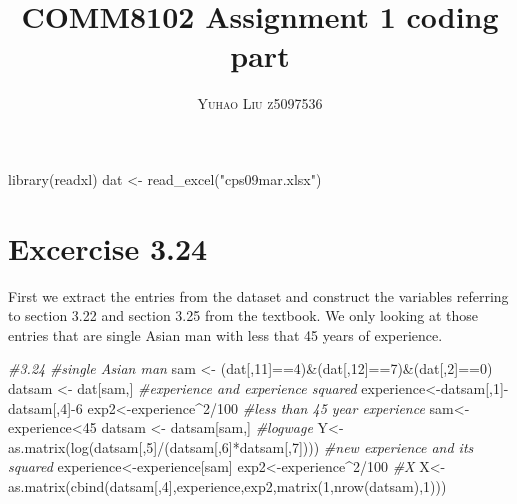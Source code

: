 \documentclass[
]{article}
\title{COMM8102 Assignment 1 coding part}
\author{\textsc{Yuhao Liu z5097536}}
\date{\vspace{-2.5em}}
\newenvironment{Shaded}{\begin{snugshade}}{\end{snugshade}}
\newcommand{\CommentTok}[1]{\textcolor[rgb]{0.56,0.35,0.01}{\textit{#1}}}
\newcommand{\DecValTok}[1]{\textcolor[rgb]{0.00,0.00,0.81}{#1}}
\newcommand{\FunctionTok}[1]{\textcolor[rgb]{0.00,0.00,0.00}{#1}}
\newcommand{\NormalTok}[1]{#1}
\newcommand{\OtherTok}[1]{\textcolor[rgb]{0.56,0.35,0.01}{#1}}
\newcommand{\SpecialCharTok}[1]{\textcolor[rgb]{0.00,0.00,0.00}{#1}}
\newcommand{\StringTok}[1]{\textcolor[rgb]{0.31,0.60,0.02}{#1}}
\begin{document}
\maketitle

\begin{Shaded}
\begin{Highlighting}[]
\FunctionTok{library}\NormalTok{(readxl)}
\NormalTok{dat }\OtherTok{\textless{}{-}} \FunctionTok{read\_excel}\NormalTok{(}\StringTok{"cps09mar.xlsx"}\NormalTok{)}
\end{Highlighting}
\end{Shaded}

\hypertarget{excercise-3.24}{%
\section{Excercise 3.24}\label{excercise-3.24}}

First we extract the entries from the dataset and construct the
variables referring to section 3.22 and section 3.25 from the textbook.
We only looking at those entries that are single Asian man with less
that 45 years of experience.

\begin{Shaded}
\begin{Highlighting}[]
\CommentTok{\#3.24 }
\CommentTok{\#single Asian man }
\NormalTok{sam }\OtherTok{\textless{}{-}}\NormalTok{ (dat[,}\DecValTok{11}\NormalTok{]}\SpecialCharTok{==}\DecValTok{4}\NormalTok{)}\SpecialCharTok{\&}\NormalTok{(dat[,}\DecValTok{12}\NormalTok{]}\SpecialCharTok{==}\DecValTok{7}\NormalTok{)}\SpecialCharTok{\&}\NormalTok{(dat[,}\DecValTok{2}\NormalTok{]}\SpecialCharTok{==}\DecValTok{0}\NormalTok{)}
\NormalTok{datsam }\OtherTok{\textless{}{-}}\NormalTok{ dat[sam,]}
\CommentTok{\#experience and experience squared}
\NormalTok{experience}\OtherTok{\textless{}{-}}\NormalTok{datsam[,}\DecValTok{1}\NormalTok{]}\SpecialCharTok{{-}}\NormalTok{datsam[,}\DecValTok{4}\NormalTok{]}\SpecialCharTok{{-}}\DecValTok{6}
\NormalTok{exp2}\OtherTok{\textless{}{-}}\NormalTok{experience}\SpecialCharTok{\^{}}\DecValTok{2}\SpecialCharTok{/}\DecValTok{100}
\CommentTok{\#less than 45 year experience}
\NormalTok{sam}\OtherTok{\textless{}{-}}\NormalTok{experience}\SpecialCharTok{\textless{}}\DecValTok{45}
\NormalTok{datsam }\OtherTok{\textless{}{-}}\NormalTok{ datsam[sam,]}
\CommentTok{\#logwage}
\NormalTok{Y}\OtherTok{\textless{}{-}}\FunctionTok{as.matrix}\NormalTok{(}\FunctionTok{log}\NormalTok{(datsam[,}\DecValTok{5}\NormalTok{]}\SpecialCharTok{/}\NormalTok{(datsam[,}\DecValTok{6}\NormalTok{]}\SpecialCharTok{*}\NormalTok{datsam[,}\DecValTok{7}\NormalTok{])))}
\CommentTok{\#new experience and its squared}
\NormalTok{experience}\OtherTok{\textless{}{-}}\NormalTok{experience[sam]}
\NormalTok{exp2}\OtherTok{\textless{}{-}}\NormalTok{experience}\SpecialCharTok{\^{}}\DecValTok{2}\SpecialCharTok{/}\DecValTok{100}
\CommentTok{\#X }
\NormalTok{X}\OtherTok{\textless{}{-}}\FunctionTok{as.matrix}\NormalTok{(}\FunctionTok{cbind}\NormalTok{(datsam[,}\DecValTok{4}\NormalTok{],experience,exp2,}\FunctionTok{matrix}\NormalTok{(}\DecValTok{1}\NormalTok{,}\FunctionTok{nrow}\NormalTok{(datsam),}\DecValTok{1}\NormalTok{)))}
\end{Highlighting}
\end{Shaded}
\end{document}
